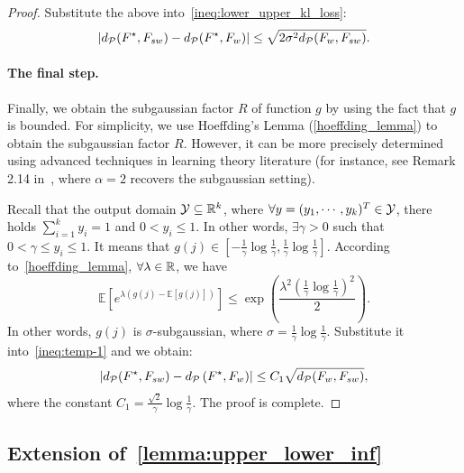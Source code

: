\begin{proof}
Substitute the above into~\eqref{ineq:lower_upper_kl_loss}:
\begin{align} \label{ineq:temp-1}
    \left| d_\mathcal{P}(F^\star, F_{sw})-d_\mathcal{P}(F^\star, F_{w}) \right| \le \sqrt{2\sigma^2 d_\mathcal{P}(F_w, F_{sw})}.
\end{align}

\paragraph{The final step.}
Finally, we obtain the subgaussian factor $R$ of function $g$ by using the fact that $g$ is bounded.
For simplicity, we use Hoeffding's Lemma (\cref{hoeffding_lemma}) to obtain the subgaussian factor $R$. However, it can be more precisely determined using advanced techniques in learning theory literature (for instance, see Remark 2.14 in~\citep{lialgorithmic}, where $\alpha=2$ recovers the subgaussian setting).

Recall that the output domain $\mathcal{Y} \subseteq \mathbb{R}^k$, where $\forall y = (y_1, \cdots, y_k)^T \in \mathcal{Y}$, there holds $\sum_{i=1}^k y_i=1$ and $0 < y_i \le 1$.
In other words, $\exists \gamma>0$ such that $0 < \gamma \le y_i \le 1$.
It means that $g(j) \in [-\frac{1}{\gamma} \log \frac{1}{\gamma}, \frac{1}{\gamma} \log \frac{1}{\gamma}]$.
According to~\cref{hoeffding_lemma}, $\forall \lambda \in \mathbb{R}$, we have
$$\mathbb{E}\left[e^{\lambda(g(j)-\mathbb{E}[g(j)])}\right] \leq \exp \left(\frac{\lambda^2 \left(\frac{1}{\gamma} \log \frac{1}{\gamma} \right)^2}{2}\right).$$
In other words, $g(j)$ is $\sigma$-subgaussian, where $\sigma=\frac{1}{\gamma} \log \frac{1}{\gamma}$.
Substitute it into~\cref{ineq:temp-1} and we obtain:
\begin{align*}
    \left| d_\mathcal{P}(F^\star, F_{sw}) - d_\mathcal{P}\left( F^\star, F_w  \right) \right| \le C_1 \sqrt{d_\mathcal{P}(F_w, F_{sw})},
\end{align*}
where the constant $C_1 = \frac{\sqrt{2}}{\gamma} \log \frac{1}{\gamma}$. The proof is complete.
\end{proof}





\subsection{Extension of~\cref{lemma:upper_lower_inf}} \label{proof:lower_upper}


